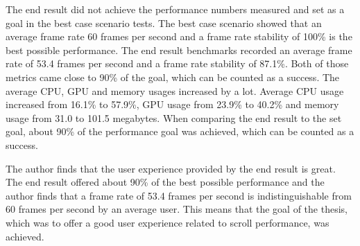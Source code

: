 \documentclass[a4paper,12pt]{article}
\begin{document}
The end result did not achieve the performance numbers measured and set as a goal in the best case scenario tests. The best case scenario showed that an average frame rate 60 frames per second and a frame rate stability of 100\% is the best possible performance. The end result benchmarks recorded an average frame rate of 53.4 frames per second and a frame rate stability of 87.1\%. Both of those metrics came close to 90\% of the goal, which can be counted as a success. The average CPU, GPU and memory usages increased by a lot. Average CPU usage increased from 16.1\% to 57.9\%, GPU usage from 23.9\% to 40.2\% and memory usage from 31.0 to 101.5 megabytes. When comparing the end result to the set goal, about 90\% of the performance goal was achieved, which can be counted as a success.

The author finds that the user experience provided by the end result is great. The end result offered about 90\% of the best possible performance and the author finds that a frame rate of 53.4 frames per second is indistinguishable from 60 frames per second by an average user. This means that the goal of the thesis, which was to offer a good user experience related to scroll performance, was achieved.


\newpage
{}
{}
\listoffigures

\newpage
{}
{}


\end{document}
